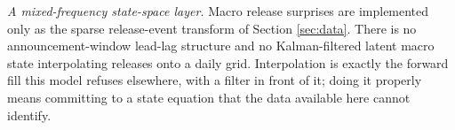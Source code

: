 \documentclass[11pt,a4paper]{article}
\begin{document}
\emph{A mixed-frequency state-space layer.} Macro release surprises are implemented
only as the sparse release-event transform of Section \ref{sec:data}. There is no
announcement-window lead-lag structure and no Kalman-filtered latent macro state
interpolating releases onto a daily grid. Interpolation is exactly the forward fill
this model refuses elsewhere, with a filter in front of it; doing it properly means
committing to a state equation that the data available here cannot identify.




\end{document}
